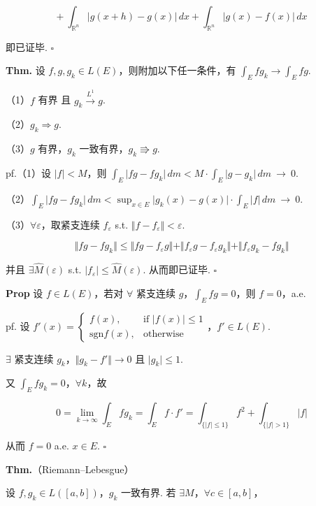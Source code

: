\documentclass[11pt]{ctexart}
\theoremstyle{definition}
\begin{document}
\[
+\ \int_{\mathbb{R}^n} \vert g(x+h) - g(x)\vert \, dx + \int_{\mathbb{R}^n} \vert g(x) - f(x)\vert \, dx
\]

即已证毕. $\square$

\textbf{Thm.} 设 $f, g, g_k \in L(E)$，则附加以下任一条件，有 $\displaystyle\int_E f g_k \to \int_E f g$.

（1）$f$ 有界 且 $g_k \xrightarrow{L^1} g$.

（2）$g_k \Rightarrow g$.

（3）$g$ 有界，$g_k$ 一致有界，$g_k \Rrightarrow g$.

pf.（1）设 $\vert f\vert < M$，则 $\displaystyle\int_E \vert fg - f g_k\vert \, dm < M \cdot \int_E \vert g - g_k\vert \, dm \ \to\ 0$.

（2）$\displaystyle\int_E \vert fg - f g_k\vert \, dm < \sup_{x \in E} \vert g_k(x) - g(x)\vert \cdot \int_E \vert f\vert \, dm \ \to\ 0$.

（3）$\forall \varepsilon$，取紧支连续 $f_\varepsilon$ s.t. $\Vert f - f_\varepsilon\Vert < \varepsilon$.

\[
\Vert fg - f g_k\Vert \leq \Vert fg - f_\varepsilon g\Vert + \Vert f_\varepsilon g - f_\varepsilon g_k\Vert + \Vert f_\varepsilon g_k - f g_k\Vert
\]

并且 $\exists \widehat{M}(\varepsilon)$ s.t. $\vert f_\varepsilon\vert \leq \widehat{M}(\varepsilon)$. 从而即已证毕. $\square$

\textbf{Prop} 设 $f \in L(E)$，若对 $\forall$ 紧支连续 $g$，$\displaystyle\int_E f g = 0$，则 $f = 0$，a.e.

pf. 设 $f'(x) = \begin{cases} f(x), & \text{if } \vert f(x)\vert \leq 1 \\ \mathrm{sgn} f(x), & \text{otherwise} \end{cases}$，$f' \in L(E)$.

$\exists$ 紧支连续 $g_k$，$\Vert g_k - f'\Vert \to 0$ 且 $\vert g_k\vert \leq 1$.

又 $\displaystyle\int_E f g_k = 0$，$\forall k$，故

\[
0 = \lim_{k \to \infty} \int_E f g_k = \int_E f \cdot f' = \int_{\{\vert f\vert \leq 1\}} f^2 + \int_{\{\vert f\vert > 1\}} \vert f\vert
\]

从而 $f = 0$  a.e. $x \in E$. $\square$

\textbf{Thm.}（Riemann–Lebesgue）

设 $f, g_k \in L([a,b])$，$g_k$ 一致有界. 若 $\exists M$，$\forall c \in [a,b]$，
\end{document}
